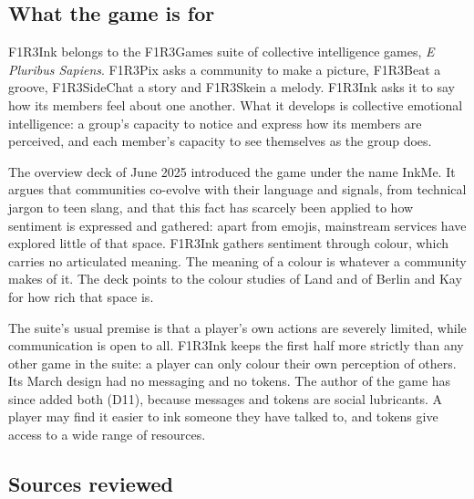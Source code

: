 \documentclass[11pt,a4paper]{article}
\begin{document}
\subsection{What the game is for}

F1R3Ink belongs to the F1R3Games suite of collective intelligence games, \emph{E Pluribus
Sapiens}. F1R3Pix asks a community to make a picture, F1R3Beat a groove, F1R3SideChat a story
and F1R3Skein a melody. F1R3Ink asks it to say how its members feel about one another. What it
develops is collective emotional intelligence: a group's capacity to notice and express how its
members are perceived, and each member's capacity to see themselves as the group does.

The overview deck of June 2025 introduced the game under the name InkMe. It argues that
communities co-evolve with their language and signals, from technical jargon to teen slang,
and that this fact has scarcely been applied to how sentiment is expressed and gathered: apart
from emojis, mainstream services have explored little of that space. F1R3Ink gathers
sentiment through colour, which carries no articulated meaning. The meaning of a colour is
whatever a community makes of it. The deck points to the colour studies of Land and of Berlin
and Kay for how rich that space is.

The suite's usual premise is that a player's own actions are severely limited, while
communication is open to all. F1R3Ink keeps the first half more strictly than any other game
in the suite: a player can only colour their own perception of others. Its March design had no
messaging and no tokens. The author of the game has since added both (D11), because messages
and tokens are social lubricants. A player may find it easier to ink someone they have talked
to, and tokens give access to a wide range of resources.

\subsection{Sources reviewed}
\end{document}
